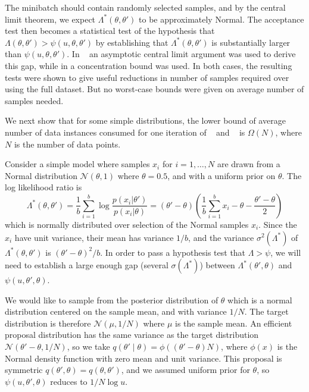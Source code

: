\documentclass{article}
\begin{document}
The minibatch should contain randomly selected samples, and
by the central limit theorem, we expect $\Lambda^*(\theta,\theta')$ to be approximately
Normal. 
The acceptance test then becomes a statistical test of the hypothesis
that $\Lambda(\theta,\theta') > \psi(u,\theta,\theta')$ by
establishing that $\Lambda^*(\theta,\theta')$ is substantially larger
than $\psi(u,\theta,\theta')$.  In ~\cite{cutting_mh_2014} an
asymptotic central limit argument was used to derive this gap, while
in \cite{icml2014c1_bardenet14} a concentration bound was used. In
both cases, the resulting tests were shown to give useful reductions
in number of samples required over using the full dataset. But no
worst-case bounds were given on average number of samples needed.

We next show that for some simple distributions, the lower
bound of average number of data instances consumed for one iteration of
~\cite{cutting_mh_2014} and ~\cite{icml2014c1_bardenet14} is
$\Omega(N)$, where $N$ is the number of data points.

Consider a simple model where samples $x_i$ for $i=1,\ldots,N$ are
drawn from a Normal distribution $\mathcal{N}(\theta,1)$ where
$\theta=0.5$, and with a uniform prior on $\theta$. The log likelihood ratio is
\begin{equation}
\Lambda^*(\theta,\theta') =  \frac{1}{b}\sum_{i=1}^b \log\frac{p(x_i|\theta')}{p(x_i|\theta)}=
  (\theta'-\theta)\left(\frac{1}{b}\sum_{i=1}^b x_i-\theta-\frac{\theta'-\theta}{2}\right)
\end{equation}
which is normally distributed over selection of the Normal samples $x_i$.
Since the $x_i$ have unit variance, their mean has variance $1/b$, and the variance $\sigma^2(\Lambda^*)$
of $\Lambda^*(\theta,\theta')$ is $(\theta'-\theta)^2/b$. In order to pass
a hypothesis test that $\Lambda > \psi$, we will need to establish a
large enough gap (several $\sigma(\Lambda^*)$) between $\Lambda^*(\theta',\theta)$
and $\psi(u,\theta',\theta)$.

We would like to sample from the posterior distribution of $\theta$
which is a normal distribution centered on the sample mean, and with
variance $1/N$.  The target distribution is therefore
$\mathcal{N}(\mu,1/N)$ where $\mu$ is the sample mean.  An efficient
proposal distribution has the same variance as the target distribution
$\mathcal{N}(\theta'-\theta,1/N)$, so we take $q(\theta'\mid\theta) =
\phi((\theta'-\theta)N)$, where $\phi(x)$ is the Normal density
function with zero mean and unit variance. This proposal is symmetric
$q(\theta',\theta)=q(\theta,\theta')$, and we assumed uniform
prior for $\theta$, so $\psi(u,\theta',\theta)$ reduces to $1/N\log
u$.
\end{document}
